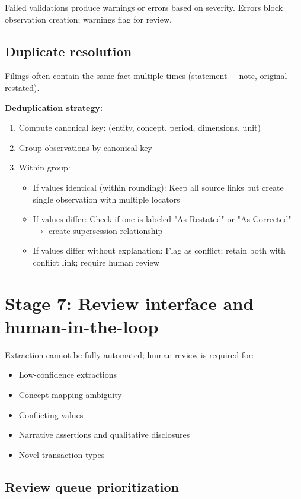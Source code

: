 Failed validations produce warnings or errors based on severity. Errors block
observation creation; warnings flag for review.

\subsection{Duplicate resolution}

Filings often contain the same fact multiple times (statement + note, original + restated).

\textbf{Deduplication strategy:}

\begin{enumerate}
\item Compute canonical key: (entity, concept, period, dimensions, unit)
\item Group observations by canonical key
\item Within group:
  \begin{itemize}
  \item If values identical (within rounding): Keep all source links but create
    single observation with multiple locators
  \item If values differ: Check if one is labeled "As Restated" or "As Corrected"
    $\rightarrow$ create supersession relationship
  \item If values differ without explanation: Flag as conflict; retain both with
    conflict link; require human review
  \end{itemize}
\end{enumerate}

\section{Stage 7: Review interface and human-in-the-loop}

Extraction cannot be fully automated; human review is required for:
\begin{itemize}
\item Low-confidence extractions
\item Concept-mapping ambiguity
\item Conflicting values
\item Narrative assertions and qualitative disclosures
\item Novel transaction types
\end{itemize}

\subsection{Review queue prioritization}

